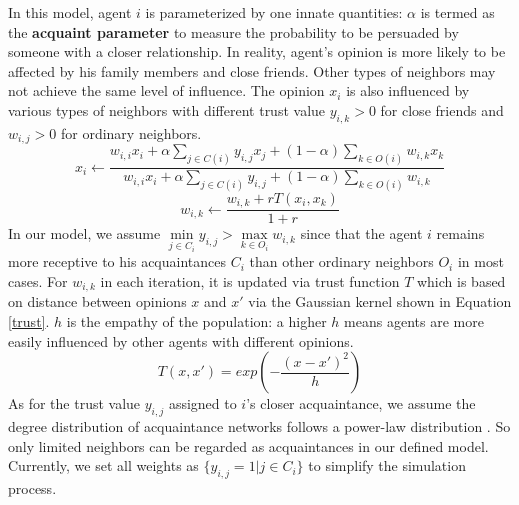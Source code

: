 \documentclass[11pt]{article}
\theoremstyle{definition}
\theoremstyle{basic}
\begin{document}
In this model, agent $i$ is parameterized by one innate quantities: $\alpha$ is termed as the \textbf{acquaint parameter} to measure the probability to be persuaded by someone with a closer relationship. In reality, agent's opinion is more likely to be affected by his family members and close friends. Other types of neighbors may not achieve the same level of influence.
The opinion $x_i$ is also influenced by various types of neighbors with different trust value $y_{i,k}>0$ for close friends and $w_{i,j}>0$ for ordinary neighbors.  
\begin{equation}
x_i \gets \frac{w_{i,i}x_i + \alpha\sum\limits_{j \in C(i)}y_{i,j}x_j + (1-\alpha)\sum\limits_{k \in O(i)}w_{i,k}x_k}{w_{i,i}x_i + \alpha\sum\limits_{j \in C(i)}y_{i,j} + (1-\alpha)\sum\limits_{k \in O(i)}w_{i,k}}
\end{equation} 
\begin{equation}
w_{i,k} \gets \frac{w_{i,k} + rT(x_i,x_k)}{1+r}
\end{equation}
In our model, we assume $\min\limits_{{j}\in C_i}{y_{i,j}} > \max\limits_{{k}\in O_i}{w_{i,k}}$ since that the agent $i$ remains more receptive to his acquaintances $C_i$ than other ordinary neighbors $O_i$ in most cases. For $w_{i,k}$ in each iteration, it is updated via trust function $T$ which is based on distance between opinions $x$ and $x{'}$ via the Gaussian kernel shown in Equation \ref{trust}. $h$ is the empathy of the population: a higher $h$ means agents are more easily influenced by other agents with different opinions. 
\begin{equation}
T(x,x{'})=exp(-\frac{(x-x{'})^2}{h})
\label{trust}
\end{equation} 
As for the trust value $y_{i,j}$ assigned to $i$'s closer acquaintance, we assume the degree distribution of acquaintance networks follows a power-law distribution \cite{muchnik2013origins}. So only limited neighbors can be regarded as acquaintances in our defined model. Currently, we set all weights as $\{y_{i,j}=1|j \in C_i\}$ to simplify the simulation process.
\end{document}
